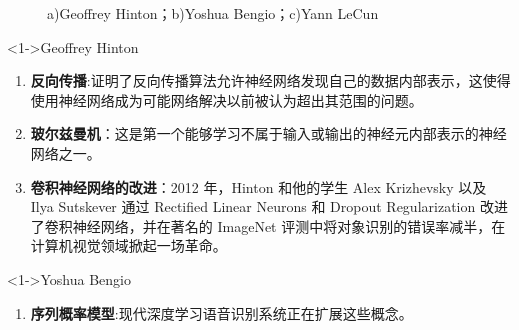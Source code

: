 \documentclass[10pt,aspectratio=43,mathserif,table]{beamer}
\begin{document}
\begin{frame}[allowframebreaks]
\begin{figure}
		\caption{a)Geoffrey Hinton；b)Yoshua Bengio；c)Yann LeCun}
	\end{figure}
	\framebreak
	\begin{block}<1->{Geoffrey Hinton}
		\begin{enumerate}
			\item<1-> {\color{blue}\textbf{反向传播}}:证明了反向传播算法允许神经网络发现自己的数据内部表示，这使得使用神经网络成为可能网络解决以前被认为超出其范围的问题。
			\item<1-> {\color{blue}\textbf{玻尔兹曼机}}：这是第一个能够学习不属于输入或输出的神经元内部表示的神经网络之一。
			\item<1-> {\color{blue}\textbf{卷积神经网络的改进}}：2012 年，Hinton 和他的学生 Alex Krizhevsky 以及 Ilya Sutskever 通过 Rectified Linear Neurons 和 Dropout Regularization 改进了卷积神经网络，并在著名的 ImageNet 评测中将对象识别的错误率减半，在计算机视觉领域掀起一场革命。
		\end{enumerate}
	\end{block}
	\framebreak
	\begin{block}<1->{Yoshua Bengio}
		\begin{enumerate}
			\item<1-> {\color{blue}\textbf{序列概率模型}}:现代深度学习语音识别系统正在扩展这些概念。

\end{enumerate}
\end{block}
\end{frame}
\end{document}

